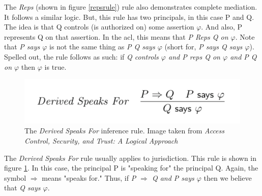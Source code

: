 \documentclass[../../main/main.tex]{subfiles}
\begin{document}
The \textit{Reps} (shown in figure \ref{repsrule}) rule also demonstrates complete mediation.  It follows a similar logic.  But, this rule has two principals, in this case P and Q.  The idea is that Q controls (is authorized on) some assertion $\varphi$. And also, P represents Q on that assertion.  In the \gls{acl}, this means that \textit{P Reps Q on $\varphi$}.  Note that \textit{P says $\varphi$} is not the same thing as \textit{P \textbar Q says $\varphi$} (short for, \textit{P says Q says $\varphi$}).  Spelled out, the rule follows as such: if \textit{Q controls $\varphi$ and P reps Q on $\varphi$ and P \textbar Q on $\varphi$} then $\varphi$ is true.

%
\begin{figure}[h]
\centering
\includegraphics[width =0.6 \textwidth]{../figures/derivedspeaksfor}
\caption{\label{derivedspeaksfor}The \textit{Derived Speaks For} inference rule. Image taken from \textit{Access Control, Security, and Trust: A Logical Approach}\cite{ChinOlder}}
\end{figure}

The \textit{Derived Speaks For} rule usually applies to jurisdiction. This rule is shown in figure \ref{derivedspeaksfor}.  In this case, the principal P is "speaking for" the principal Q.  Again, the symbol $\Rightarrow$ means "speaks for."  Thus, if \textit{P $\Rightarrow$ Q and P says $\varphi$} then we believe that \textit{Q says $\varphi$}.

%
\end{document}
